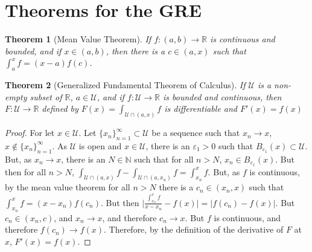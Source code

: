\documentclass[oneside]{book}
\theoremstyle{mystyle}
\newtheorem{theorem}{Theorem}[section]
\begin{document}
\section{Theorems for the GRE}
\begin{theorem}[Mean Value Theorem]
If $f:(a,b)\rightarrow \mathbb{R}$ is continuous and bounded, and if $x\in (a,b)$, then there is a $c\in(a,x)$ such that $\int_{a}^{x}f = (x-a)f(c)$.
\end{theorem}
\begin{theorem}[Generalized Fundamental Theorem of Calculus]
If $\mathcal{U}$ is a non-empty subset of $\mathbb{R}$, $a\in \mathcal{U}$, and if $f:\mathcal{U}\rightarrow \mathbb{R}$ is bounded and continuous, then $F:\mathcal{U}\rightarrow \mathbb{R}$ defined by $F(x) = \int_{\mathcal{U}\cap (a,x)}f$ is differentiable and $F'(x) = f(x)$
\end{theorem}
\begin{proof}
For let $x\in \mathcal{U}$. Let $\{x_n\}_{n=1}^{\infty}\subset \mathcal{U}$ be a sequence such that $x_n \rightarrow x$, $x\notin \{x_n\}_{n=1}^{\infty}$. As $\mathcal{U}$ is open and $x\in \mathcal{U}$, there is an $\varepsilon_1>0$ such that $B_{\varepsilon_1}(x)\subset \mathcal{U}$. But, as $x_n\rightarrow x$, there is an $N\in \mathbb{N}$ such that for all $n>N$, $x_n\in B_{\varepsilon_1}(x)$. But then for all $n>N$, $\int_{\mathcal{U}\cap(a,x)}f - \int_{\mathcal{U}\cap(a,x_n)}f = \int_{x_n}^{x}f$. But, as $f$ is continuous, by the mean value theorem for all $n>N$ there is a $c_n\in (x_n,x)$ such that $\int_{x_n}^{x}f = (x-x_n)f(c_n)$. But then $\big|\frac{\int_{x_n}^{x}f}{x-x_n} - f(x)| = |f(c_n)-f(x)|$. But $c_n \in (x_n,c)$, and $x_n \rightarrow x$, and therefore $c_n \rightarrow x$. But $f$ is continuous, and therefore $f(c_n)\rightarrow f(x)$. Therefore, by the definition of the derivative of $F$ at $x$, $F'(x) = f(x)$. 
\end{proof}
%
\end{document}
